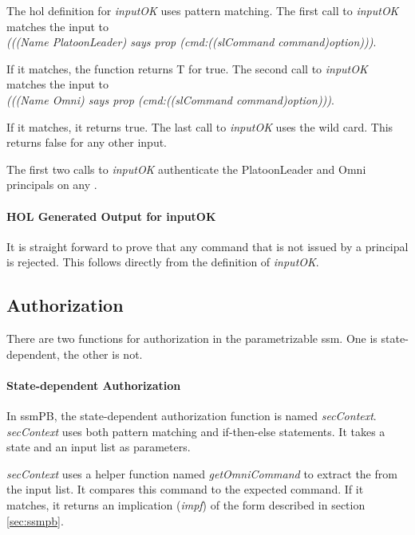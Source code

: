 \documentclass[../../main/main.tex]{subfiles}
\begin{document}
The \gls{hol} definition for \textit{inputOK} uses pattern matching.  The first call to \textit{inputOK} matches the input to\\ \centering \textit{(((Name PlatoonLeader) says prop (cmd:((slCommand command)option)))}.\\ \raggedright If it matches, the function returns T for true.  The second call to \textit{inputOK} matches the input to\\
 \centering \textit{(((Name Omni) says prop (cmd:((slCommand command)option)))}.\\  \raggedright If it matches, it returns true.  The last call to \textit{inputOK}  uses the wild card.  This returns false for any other input.

The first two calls to \textit{inputOK} authenticate the PlatoonLeader and Omni principals on any .

\paragraph*{HOL Generated Output for inputOK}

\HOLssmPBIntegratedTheoremsinputOKXXdef

It is straight forward to prove that any command that is not issued by a principal is rejected.  This follows directly from the definition of \textit{inputOK}.

\HOLssmPBIntegratedTheoremsinputOKXXcmdXXrejectXXlemma

\subsection{Authorization}
There are two functions for authorization in the parametrizable ssm.  One is state-dependent, the other is not.  

\paragraph*{State-dependent Authorization}
In ssmPB, the state-dependent authorization function is named \textit{secContext}.  \textit{secContext} uses both pattern matching and if-then-else statements. It takes a state and an input list as parameters.

\HOLPBIntegratedDefDefinitionssecContextXXdef

\textit{secContext} uses a helper function named \textit{getOmniCommand} to extract the  from the input list.  It compares this command to the expected command.  If it matches, it returns an implication (\textit{impf}) of the form described in section \ref{sec:ssmpb}.
\end{document}
